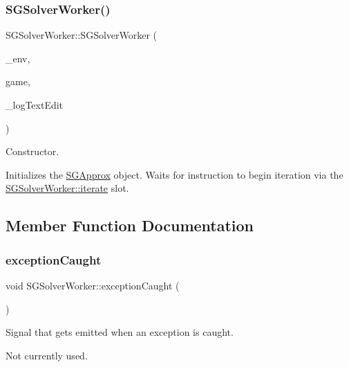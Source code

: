 \subsubsection{\texorpdfstring{S\+G\+Solver\+Worker()}{SGSolverWorker()}}
{\footnotesize\ttfamily S\+G\+Solver\+Worker\+::\+S\+G\+Solver\+Worker (\begin{DoxyParamCaption}\item[{const \hyperlink{classSGEnv}{S\+G\+Env} \&}]{\+\_\+env,  }\item[{const \hyperlink{classSGGame}{S\+G\+Game} \&}]{game,  }\item[{Q\+Text\+Edit $\ast$}]{\+\_\+log\+Text\+Edit }\end{DoxyParamCaption})\hspace{0.3cm}{\ttfamily [inline]}}



Constructor. 

Initializes the \hyperlink{classSGApprox}{S\+G\+Approx} object. Waits for instruction to begin iteration via the \hyperlink{classSGSolverWorker_aeb03e91da258a3c13e8d13b66605b973}{S\+G\+Solver\+Worker\+::iterate} slot. 

\subsection{Member Function Documentation}
\mbox{\label{classSGSolverWorker_abf7ff15ecba6f0ec29bc26f18cd76749}} 
\subsubsection{\texorpdfstring{exception\+Caught}{exceptionCaught}}
{\footnotesize\ttfamily void S\+G\+Solver\+Worker\+::exception\+Caught (\begin{DoxyParamCaption}{ }\end{DoxyParamCaption})\hspace{0.3cm}{\ttfamily [signal]}}



Signal that gets emitted when an exception is caught. 

Not currently used. \mbox{\label{classSGSolverWorker_aeb03e91da258a3c13e8d13b66605b973}} 
